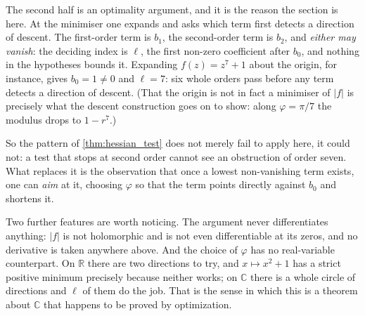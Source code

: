 \begin{remark}
\label{rem:fta_needs_higher_order}
The second half is an optimality argument, and it is the reason the section is here. At the
minimiser one expands and asks which term first detects a direction of descent. The first-order
term is $b_1$, the second-order term is $b_2$, and \emph{either may vanish}: the deciding index
is $\ell$, the first non-zero coefficient after $b_0$, and nothing in the hypotheses bounds it.
Expanding $f(z) = z^7+1$ about the origin, for instance, gives $b_0 = 1 \neq 0$ and $\ell = 7$:
six whole orders pass before any term detects a direction of descent. (That the origin is not
in fact a minimiser of $\lvert f\rvert$ is precisely what the descent construction goes on to
show: along $\varphi = \pi/7$ the modulus drops to $1-r^7$.)

So the pattern of \cref{thm:hessian_test} does not merely fail to apply here, it could not: a
test that stops at second order cannot see an obstruction of order seven. What replaces it is the
observation that once a lowest non-vanishing term exists, one can \emph{aim} at it, choosing
$\varphi$ so that the term points directly against $b_0$ and shortens it.

Two further features are worth noticing. The argument never differentiates anything: $\lvert
f\rvert$ is not holomorphic and is not even differentiable at its zeros, and no derivative is
taken anywhere above. And the choice of $\varphi$ has no real-variable counterpart. On
$\mathbb{R}$ there are two directions to try, and $x \mapsto x^2 + 1$ has a strict positive
minimum precisely because neither works; on $\mathbb{C}$ there is a whole circle of directions
and $\ell$ of them do the job. That is the sense in which this is a theorem about $\mathbb{C}$
that happens to be proved by optimization.
\end{remark}

